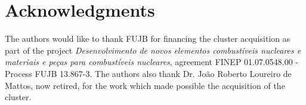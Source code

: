 \documentclass[twoside,a4paper,12pt,english]{inac19}
\begin{document}









\section*{Acknowledgments}
The authors would like to thank FUJB for financing the cluster acquisition
as part of the project \textit{Desenvolvimento de novos elementos combust\'{i}veis nucleares
  e materiais e pe\c{c}as para combust\'{i}veis nucleares}, agreement FINEP 01.07.0548.00 - Process FUJB 13.867-3.
The authors also thank Dr. Jo\~{a}o Roberto Loureiro de Mattos, now retired, for the work which made possible the acquisition of the cluster.

\end{document}
